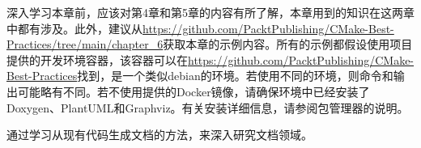 深入学习本章前，应该对第4章和第5章的内容有所了解，本章用到的知识在这两章中都有涉及。此外，建议从\url{https://github.com/PacktPublishing/CMake-Best-Practices/tree/main/chapter_6}获取本章的示例内容。所有的示例都假设使用项目提供的开发环境容器，该容器可以在\url{https://github.com/PacktPublishing/CMake-Best-Practices}找到，是一个类似debian的环境。若使用不同的环境，则命令和输出可能略有不同。若不使用提供的Docker镜像，请确保环境中已经安装了Doxygen、PlantUML和Graphviz。有关安装详细信息，请参阅包管理器的说明。

通过学习从现有代码生成文档的方法，来深入研究文档领域。